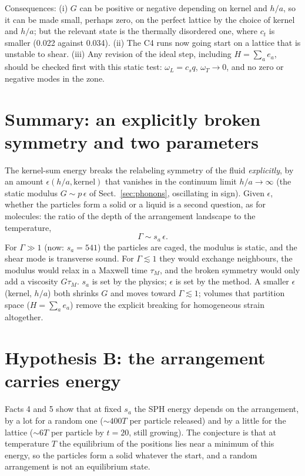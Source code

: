 \documentclass[11pt,aps,preprint,nofootinbib,superscriptaddress,tightenlines]{revtex4-2}
\def\st{\begin{equation}}
\def\stp{\end{equation}}
\def\Sect#1{Sect.~\ref{#1}}
\begin{document}
Consequences: (i) $G$ can be positive or negative depending on kernel and $h/a$, so it can be
made small, perhaps zero, on the perfect lattice by the choice of kernel and $h/a$; but the
relevant state is the thermally disordered one, where $c_t$ is smaller (0.022 against 0.034).
(ii) The C4 runs now going start on a lattice that is unstable to shear.  (iii) Any revision
of the ideal step, including $H=\sum_ae_a$, should be checked first with this static test:
$\omega_L=c_sq$, $\omega_T\to0$, and no zero or negative modes in the zone.

\section{Summary: an explicitly broken symmetry and two parameters}
\label{sec:summary}

The kernel-sum energy breaks the relabeling symmetry of the fluid \emph{explicitly}, by an
amount $\epsilon(h/a,\text{kernel})$ that vanishes in the continuum limit $h/a\to\infty$ (the
static modulus $G\sim p\,\epsilon$ of \Sect{sec:phonons}, oscillating in sign).  Given $\epsilon$,
whether the particles form a solid or a liquid is a second question, as for molecules: the ratio
of the depth of the arrangement landscape to the temperature,
\st
\Gamma\sim s_a\,\epsilon .
\stp
For $\Gamma\gg1$ (now: $s_a=541$) the particles are caged, the modulus is static, and the shear
mode is transverse sound.  For $\Gamma\lesssim1$ they would exchange neighbours, the modulus
would relax in a Maxwell time $\tau_M$, and the broken symmetry would only add a viscosity
$G\tau_M$.  $s_a$ is set by the physics; $\epsilon$ is set by the method.  A smaller $\epsilon$
(kernel, $h/a$) both shrinks $G$ and moves toward $\Gamma\lesssim1$; volumes that partition space
($H=\sum_ae_a$) remove the explicit breaking for homogeneous strain altogether.

\section{Hypothesis B: the arrangement carries energy}
\label{sec:B}

Facts 4 and 5 show that at fixed $s_a$ the SPH energy depends on the arrangement, by a lot for
a random one ($\sim400T$ per particle released) and by a little for the lattice ($\sim6T$ per
particle by $t=20$, still growing).  The conjecture is that at temperature $T$ the equilibrium
of the positions lies near a minimum of this energy, so the particles form a solid whatever
the start, and a random arrangement is not an equilibrium state.
\end{document}
